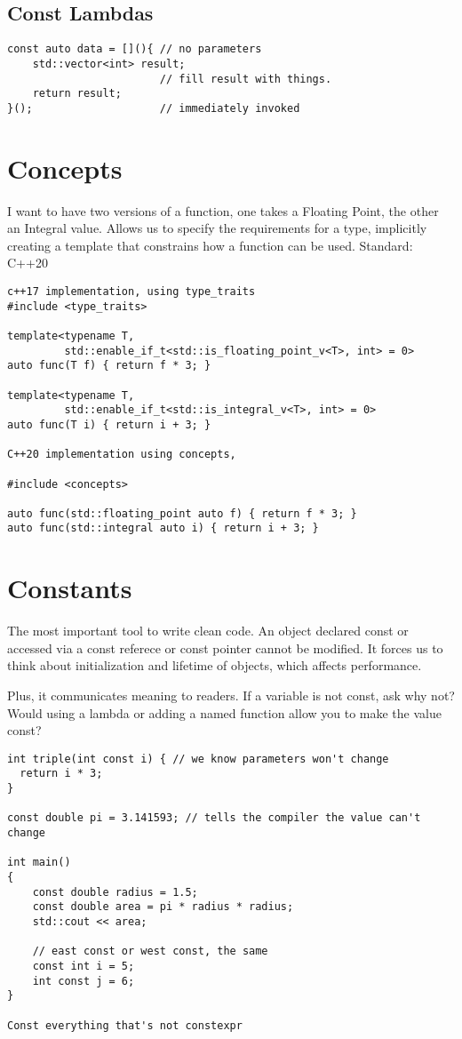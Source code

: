 \documentclass[openany]{report}
\begin{document}
\subsection{Const Lambdas}

\begin{verbatim}
const auto data = [](){ // no parameters
    std::vector<int> result;
                        // fill result with things. 
    return result;
}();                    // immediately invoked
\end{verbatim}

\section{Concepts}

I want to have two versions of a function, one takes a Floating Point, the other an Integral value.
Allows us to specify the requirements for a type, implicitly creating a template
that constrains how a function can be used. Standard: C++20

\begin{verbatim}
c++17 implementation, using type_traits
#include <type_traits>

template<typename T,
         std::enable_if_t<std::is_floating_point_v<T>, int> = 0>
auto func(T f) { return f * 3; }

template<typename T,
         std::enable_if_t<std::is_integral_v<T>, int> = 0>
auto func(T i) { return i + 3; }

C++20 implementation using concepts, 

#include <concepts>

auto func(std::floating_point auto f) { return f * 3; }
auto func(std::integral auto i) { return i + 3; }
\end{verbatim}

\section{Constants}

The most important tool to write clean code.
An object declared const or accessed via a const referece or const pointer cannot be modified.
It forces us to think about initialization and lifetime of objects, which affects performance. 

Plus, it communicates meaning to readers. 
If a variable is not const, ask why not?
Would using a lambda or adding a named function allow you to make the value const?

\begin{verbatim}
int triple(int const i) { // we know parameters won't change
  return i * 3;
}

const double pi = 3.141593; // tells the compiler the value can't change

int main()
{
    const double radius = 1.5;
    const double area = pi * radius * radius;
    std::cout << area;

    // east const or west const, the same
    const int i = 5;
    int const j = 6;
}

Const everything that's not constexpr
\end{verbatim}
\end{document}
